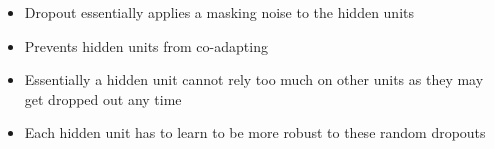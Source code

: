 \documentclass[serif,aspectratio=169]{beamer}
\begin{document}
\begin{frame}
\begin{columns}
		\begin{overlayarea}{\textwidth}{\textheight}
			\begin{itemize}
				\justifying
				\item Dropout essentially applies a masking noise to the hidden units
				\item<2-> Prevents hidden units from co-adapting
				\item<3-> Essentially a hidden unit cannot rely too much on other units as they may get dropped out any time
				\item<4-> Each hidden unit has to learn to be more robust to these random dropouts
			\end{itemize}
		\end{overlayarea}
	\end{columns}
\end{frame}
						
\end{document}

